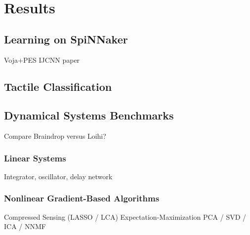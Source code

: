 \chapter{Results}
\label{chapt:results}

\section{Learning on SpiNNaker}

Voja+PES IJCNN paper

\section{Tactile Classification}

\section{Dynamical Systems Benchmarks}

Compare Braindrop versus Loihi?

\subsection{Linear Systems}

Integrator, oscillator, delay network

\subsection{Nonlinear Gradient-Based Algorithms}

Compressed Sensing (LASSO / LCA)
Expectation-Maximization
PCA / SVD / ICA / NNMF

